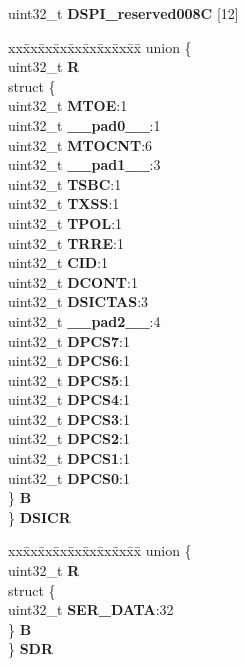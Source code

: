 \begin{DoxyCompactItemize}
\begin{tabbing}
\end{tabbing}\item 
\mbox{\label{structDSPI__tag_a684c6349b0dbfeea0c1e954921aa6779}} 
uint32\+\_\+t {\bfseries D\+S\+P\+I\+\_\+reserved008C} \mbox{[}12\mbox{]}
\item 
\mbox{\label{structDSPI__tag_ac66419b513a16b7ddba8821ea58977a3}} 
\begin{tabbing}
xx\=xx\=xx\=xx\=xx\=xx\=xx\=xx\=xx\=\kill
union \{\\
\>uint32\_t {\bfseries R}\\
\>struct \{\\
\>\>uint32\_t {\bfseries MTOE}:1\\
\>\>uint32\_t {\bfseries \_\_pad0\_\_}:1\\
\>\>uint32\_t {\bfseries MTOCNT}:6\\
\>\>uint32\_t {\bfseries \_\_pad1\_\_}:3\\
\>\>uint32\_t {\bfseries TSBC}:1\\
\>\>uint32\_t {\bfseries TXSS}:1\\
\>\>uint32\_t {\bfseries TPOL}:1\\
\>\>uint32\_t {\bfseries TRRE}:1\\
\>\>uint32\_t {\bfseries CID}:1\\
\>\>uint32\_t {\bfseries DCONT}:1\\
\>\>uint32\_t {\bfseries DSICTAS}:3\\
\>\>uint32\_t {\bfseries \_\_pad2\_\_}:4\\
\>\>uint32\_t {\bfseries DPCS7}:1\\
\>\>uint32\_t {\bfseries DPCS6}:1\\
\>\>uint32\_t {\bfseries DPCS5}:1\\
\>\>uint32\_t {\bfseries DPCS4}:1\\
\>\>uint32\_t {\bfseries DPCS3}:1\\
\>\>uint32\_t {\bfseries DPCS2}:1\\
\>\>uint32\_t {\bfseries DPCS1}:1\\
\>\>uint32\_t {\bfseries DPCS0}:1\\
\>\} {\bfseries B}\\
\} {\bfseries DSICR}\\

\end{tabbing}\item 
\mbox{\label{structDSPI__tag_a82dbd48b4d60a4847e3314ec626fa0c4}} 
\begin{tabbing}
xx\=xx\=xx\=xx\=xx\=xx\=xx\=xx\=xx\=\kill
union \{\\
\>uint32\_t {\bfseries R}\\
\>struct \{\\
\>\>uint32\_t {\bfseries SER\_DATA}:32\\
\>\} {\bfseries B}\\
\} {\bfseries SDR}\\


\end{tabbing}
\end{DoxyCompactItemize}
